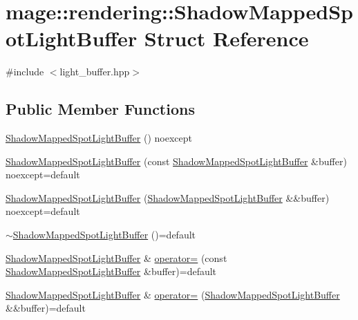\hypertarget{structmage_1_1rendering_1_1_shadow_mapped_spot_light_buffer}{}\section{mage\+:\+:rendering\+:\+:Shadow\+Mapped\+Spot\+Light\+Buffer Struct Reference}
\label{structmage_1_1rendering_1_1_shadow_mapped_spot_light_buffer}


{\ttfamily \#include $<$light\+\_\+buffer.\+hpp$>$}

\subsection*{Public Member Functions}
\begin{DoxyCompactItemize}
\item 
\mbox{\hyperlink{structmage_1_1rendering_1_1_shadow_mapped_spot_light_buffer_a88d393bc59e25f35d29e478de8c81c89}{Shadow\+Mapped\+Spot\+Light\+Buffer}} () noexcept
\item 
\mbox{\hyperlink{structmage_1_1rendering_1_1_shadow_mapped_spot_light_buffer_ac984180fa57278b851bbaf3b081a4343}{Shadow\+Mapped\+Spot\+Light\+Buffer}} (const \mbox{\hyperlink{structmage_1_1rendering_1_1_shadow_mapped_spot_light_buffer}{Shadow\+Mapped\+Spot\+Light\+Buffer}} \&buffer) noexcept=default
\item 
\mbox{\hyperlink{structmage_1_1rendering_1_1_shadow_mapped_spot_light_buffer_a9042ab916ee834f5519b5930de286ea4}{Shadow\+Mapped\+Spot\+Light\+Buffer}} (\mbox{\hyperlink{structmage_1_1rendering_1_1_shadow_mapped_spot_light_buffer}{Shadow\+Mapped\+Spot\+Light\+Buffer}} \&\&buffer) noexcept=default
\item 
\mbox{\hyperlink{structmage_1_1rendering_1_1_shadow_mapped_spot_light_buffer_ae651274fb4d113e173b62cb18191f1b9}{$\sim$\+Shadow\+Mapped\+Spot\+Light\+Buffer}} ()=default
\item 
\mbox{\hyperlink{structmage_1_1rendering_1_1_shadow_mapped_spot_light_buffer}{Shadow\+Mapped\+Spot\+Light\+Buffer}} \& \mbox{\hyperlink{structmage_1_1rendering_1_1_shadow_mapped_spot_light_buffer_a2c209b2648740696d45113a152e648fb}{operator=}} (const \mbox{\hyperlink{structmage_1_1rendering_1_1_shadow_mapped_spot_light_buffer}{Shadow\+Mapped\+Spot\+Light\+Buffer}} \&buffer)=default
\item 
\mbox{\hyperlink{structmage_1_1rendering_1_1_shadow_mapped_spot_light_buffer}{Shadow\+Mapped\+Spot\+Light\+Buffer}} \& \mbox{\hyperlink{structmage_1_1rendering_1_1_shadow_mapped_spot_light_buffer_ae2687b41af138b43fc814883310a877b}{operator=}} (\mbox{\hyperlink{structmage_1_1rendering_1_1_shadow_mapped_spot_light_buffer}{Shadow\+Mapped\+Spot\+Light\+Buffer}} \&\&buffer)=default
\end{DoxyCompactItemize}
